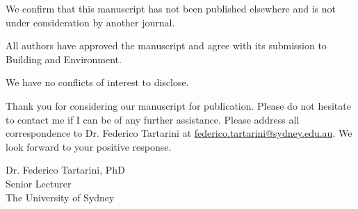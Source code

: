 \documentclass[11pt,a4paper,roman]{moderncv}        %
\begin{document}
We confirm that this manuscript has not been published elsewhere and is not under consideration by another journal.

All authors have approved the manuscript and agree with its submission to Building and Environment.

We have no conflicts of interest to disclose.

Thank you for considering our manuscript for publication.
Please do not hesitate to contact me if I can be of any further assistance.
Please address all correspondence to Dr. Federico Tartarini at \href{mailto:federico.tartarini@sydney.edu.au}{federico.tartarini@sydney.edu.au}.
We look forward to your positive response.

\bigskip

Dr. Federico Tartarini, PhD\\
Senior Lecturer\\
The University of Sydney\\
\end{document}
